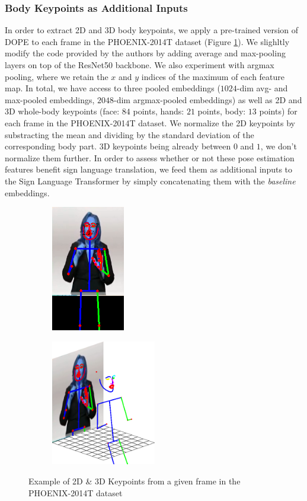 \documentclass[final]{cvpr}
\begin{document}
\subsubsection{Body Keypoints as Additional Inputs}
In order to extract 2D and 3D body keypoints, we apply a pre-trained version of DOPE \cite{dope} to each frame in the PHOENIX-2014T dataset (Figure \ref{fig:2d_3d}). We slighltly modify the code provided by the authors by adding average and max-pooling layers on top of the ResNet50 backbone. We also experiment with argmax pooling, where we retain the $x$ and $y$ indices of the maximum of each feature map. In total, we have access to three pooled embeddings ($1024$-dim avg- and max-pooled embeddings, $2048$-dim argmax-pooled embeddings) as well as 2D and 3D whole-body keypoints (face: $84$ points, hands: $21$ points, body: $13$ points) for each frame in the PHOENIX-2014T dataset. We normalize the 2D keypoints by substracting the mean and dividing by the standard deviation of the corresponding body part. 3D keypoints being already between $0$ and $1$, we don't normalize them further. In order to assess whether or not these pose estimation features benefit sign language translation, we feed them as additional inputs to the Sign Language Transformer by simply concatenating them with the \textit{baseline} embeddings.

\begin{figure}[h]
	\begin{subfigure}[h]{0.5\linewidth}
		\centering
			\includegraphics[height=5.5cm]{fig/toy_DOPE_v1_0_0_2d.png}
	\end{subfigure}\hfill
	\begin{subfigure}[]{0.5\linewidth}
		\centering
		\includegraphics[height=5.5cm]{fig/toy_DOPE_v1_0_0_3d_cropped.png}
	\end{subfigure}
	\caption{Example of 2D \& 3D Keypoints from a given frame in the PHOENIX-2014T dataset}
	\label{fig:2d_3d}
\end{figure}
\end{document}
